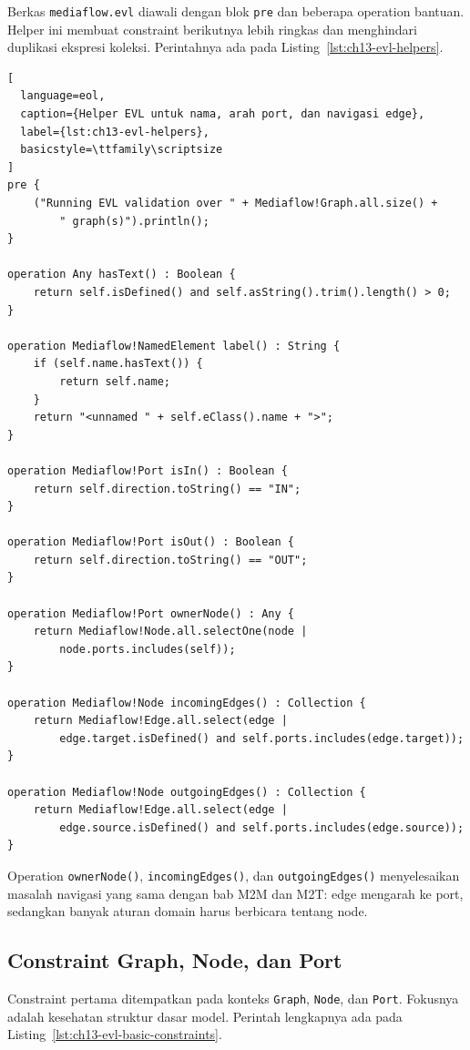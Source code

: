 Berkas \texttt{mediaflow.evl} diawali dengan blok \texttt{pre} dan beberapa operation bantuan. Helper ini membuat constraint berikutnya lebih ringkas dan menghindari duplikasi ekspresi koleksi. Perintahnya ada pada Listing~\ref{lst:ch13-evl-helpers}.

\begin{lstlisting}[
  language=eol,
  caption={Helper EVL untuk nama, arah port, dan navigasi edge},
  label={lst:ch13-evl-helpers},
  basicstyle=\ttfamily\scriptsize
]
pre {
    ("Running EVL validation over " + Mediaflow!Graph.all.size() +
        " graph(s)").println();
}

operation Any hasText() : Boolean {
    return self.isDefined() and self.asString().trim().length() > 0;
}

operation Mediaflow!NamedElement label() : String {
    if (self.name.hasText()) {
        return self.name;
    }
    return "<unnamed " + self.eClass().name + ">";
}

operation Mediaflow!Port isIn() : Boolean {
    return self.direction.toString() == "IN";
}

operation Mediaflow!Port isOut() : Boolean {
    return self.direction.toString() == "OUT";
}

operation Mediaflow!Port ownerNode() : Any {
    return Mediaflow!Node.all.selectOne(node |
        node.ports.includes(self));
}

operation Mediaflow!Node incomingEdges() : Collection {
    return Mediaflow!Edge.all.select(edge |
        edge.target.isDefined() and self.ports.includes(edge.target));
}

operation Mediaflow!Node outgoingEdges() : Collection {
    return Mediaflow!Edge.all.select(edge |
        edge.source.isDefined() and self.ports.includes(edge.source));
}
\end{lstlisting}

\noindent Operation \texttt{ownerNode()}, \texttt{incomingEdges()}, dan \texttt{outgoingEdges()} menyelesaikan masalah navigasi yang sama dengan bab M2M dan M2T: edge mengarah ke port, sedangkan banyak aturan domain harus berbicara tentang node.

\subsection{Constraint Graph, Node, dan Port}

Constraint pertama ditempatkan pada konteks \texttt{Graph}, \texttt{Node}, dan \texttt{Port}. Fokusnya adalah kesehatan struktur dasar model. Perintah lengkapnya ada pada Listing~\ref{lst:ch13-evl-basic-constraints}.

